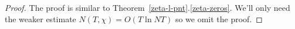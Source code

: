 \begin{proof}
The proof is similar to Theorem~\ref{zeta-l-pnt}.\ref{zeta-zeros}. We'll only need the weaker estimate $N(T,\chi)=O(T\ln NT)$ so we omit the proof.
%

\end{proof}
